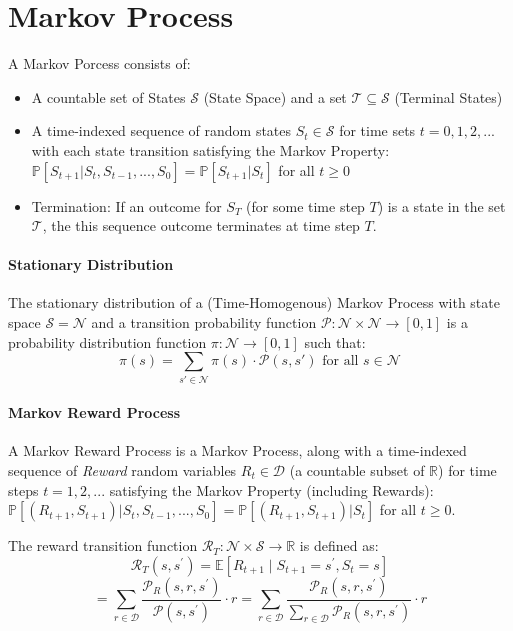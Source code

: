 \documentclass[11pt]{article}
\begin{document}
\maketitle
\thispagestyle{first}

\section*{Markov Process}
A Markov Porcess consists of:
\begin{itemize}
    \item A countable set of States $\mathcal{S} $ (State Space) and a set $\mathcal{T}\subseteq \mathcal{S}$ (Terminal States)
    \item A time-indexed sequence of random states $S_t \in \mathcal{S}$ for time sets $t = 0, 1, 2,...$ with each state transition satisfying the Markov Property: $ \mathbb{P} [S_{t+1}| S_t, S_{t-1}, ..., S_0] = \mathbb{P}[S_{t+1}|S_t]$ for all $t \geq 0$
    \item Termination: If an outcome for $S_T$ (for some time step $T$) is a state in the set $\mathcal{T}$, the this sequence outcome terminates at time step $T$.
\end{itemize}

\paragraph*{Stationary Distribution} The stationary distribution of a (Time-Homogenous) Markov Process with state space $\mathcal{S} = \mathcal{N}$ and a transition probability function $\mathcal{P} : \mathcal{N}\times\mathcal{N}\rightarrow[0, 1]$ is a probability distribution function $\pi:\mathcal{N}\rightarrow[0,1]$ such that: 
$$
\pi(s) = \sum_{s'\in\mathcal{N}}\pi(s)\cdot \mathcal{P}(s, s') \text{ for all } s \in \mathcal{N}
$$
\paragraph*{Markov Reward Process}
A Markov Reward Process is a Markov Process, along with a time-indexed sequence of \textit{Reward} random variables $R_t \in \mathcal{D}$  (a countable subset of $\mathbb{R}$) for time steps $t = 1, 2, ...$ satisfying the Markov Property (including Rewards): $\mathbb{P}[(R_{t+1}, S_{t+1})|S_t, S_{t-1}, ..., S_0] = \mathbb{P}[(R_{t+1}, S_{t+1})|S_t]$ for all $t \geq 0$.

The reward transition function $\mathcal{R}_T: \mathcal{N} \times \mathcal{S} \rightarrow \mathbb{R}$ is defined as:
$$
\mathcal{R}_T\left(s, s^{\prime}\right)=\mathbb{E}\left[R_{t+1} \mid S_{t+1}=s^{\prime}, S_t=s\right]
$$
$$
=\sum_{r \in \mathcal{D}} \frac{\mathcal{P}_R\left(s, r, s^{\prime}\right)}{\mathcal{P}\left(s, s^{\prime}\right)} \cdot r=\sum_{r \in \mathcal{D}} \frac{\mathcal{P}_R\left(s, r, s^{\prime}\right)}{\sum_{r \in \mathcal{D}} \mathcal{P}_R\left(s, r, s^{\prime}\right)} \cdot r
$$
\end{document}
